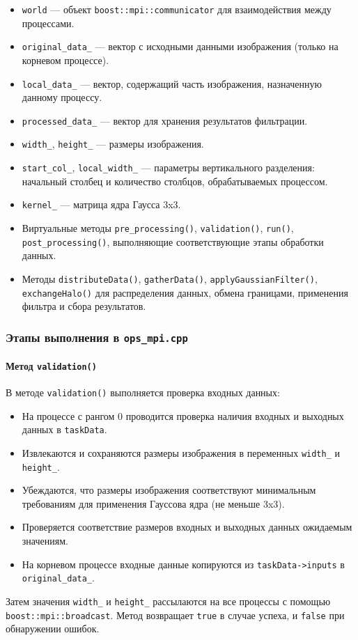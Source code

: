 \documentclass[12pt]{article}
\begin{document}
\begin{itemize}
    \item \texttt{world} — объект \texttt{boost::mpi::communicator} для взаимодействия между процессами.
    \item \texttt{original\_data\_} — вектор с исходными данными изображения (только на корневом процессе).
    \item \texttt{local\_data\_} — вектор, содержащий часть изображения, назначенную данному процессу.
    \item \texttt{processed\_data\_} — вектор для хранения результатов фильтрации.
    \item \texttt{width\_}, \texttt{height\_} — размеры изображения.
    \item \texttt{start\_col\_}, \texttt{local\_width\_} — параметры вертикального разделения: начальный столбец и количество столбцов, обрабатываемых процессом.
    \item \texttt{kernel\_} — матрица ядра Гаусса 3x3.
    \item Виртуальные методы \texttt{pre\_processing()}, \texttt{validation()}, \texttt{run()}, \texttt{post\_processing()}, выполняющие соответствующие этапы обработки данных.
    \item Методы \texttt{distributeData()}, \texttt{gatherData()}, \texttt{applyGaussianFilter()}, \texttt{exchangeHalo()} для распределения данных, обмена границами, применения фильтра и сбора результатов.
\end{itemize}

\subsubsection{Этапы выполнения в \texttt{ops\_mpi.cpp}}

\paragraph{Метод \texttt{validation()}}
В методе \texttt{validation()} выполняется проверка входных данных:
\begin{itemize}
    \item На процессе с рангом 0 проводится проверка наличия входных и выходных данных в \texttt{taskData}.
    \item Извлекаются и сохраняются размеры изображения в переменных \texttt{width\_} и \texttt{height\_}.
    \item Убеждаются, что размеры изображения соответствуют минимальным требованиям для применения Гауссова ядра (не меньше 3x3).
    \item Проверяется соответствие размеров входных и выходных данных ожидаемым значениям.
    \item На корневом процессе входные данные копируются из \texttt{taskData->inputs} в \texttt{original\_data\_}.
\end{itemize}
Затем значения \texttt{width\_} и \texttt{height\_} рассылаются на все процессы с помощью \texttt{boost::mpi::broadcast}. Метод возвращает \texttt{true} в случае успеха, и \texttt{false} при обнаружении ошибок.
\end{document}
